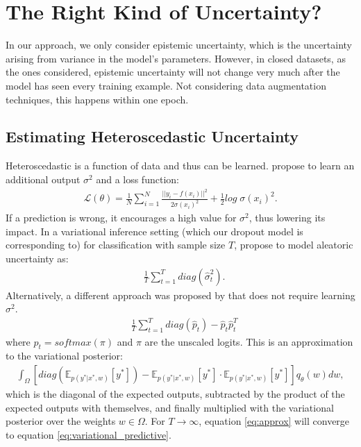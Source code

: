 \documentclass[a4paper,cleardoubleempty,BCOR1cm, 11pt]{report}
\begin{document}
\section{The Right Kind of Uncertainty?}
In our approach, we only consider epistemic uncertainty, which is the uncertainty arising from variance in the model's parameters. However, in closed datasets, as the ones considered, epistemic uncertainty will not change very much after the model has seen every training example. Not considering data augmentation techniques, this happens within one epoch. %


\subsection{Estimating Heteroscedastic Uncertainty}
Heteroscedastic is a function of data and thus can be learned. \citet{kendall2017uncertainties} propose to learn an additional output $\sigma^2$ and a loss function:
\begin{align}
\mathcal{L}(\theta) = \frac{1}{N}\sum_{i=1}^{N} \frac{||y_i-f(x_i)||^2}{2\sigma(x_i)^2} + \frac{1}{2}log\;\sigma(x_i)^2.
\end{align}
If a prediction is wrong, it encourages a high value for $\sigma^2$, thus lowering its impact. In a variational inference setting (which our dropout model is corresponding to) for classification with sample size $T$, \citet{kendall2017uncertainties} propose to model aleatoric uncertainty as:
\begin{align}
&\frac{1}{T}\sum_{t=1}^{T}diag(\hat{\sigma}_t^2).
\end{align}
Alternatively, a different approach was proposed by \citet{kwon2020uncertainty} that does not require learning $\sigma^2$. 
\begin{align}
\label{eq:approx}
&\frac{1}{T}\sum_{t=1}^{T}diag(\hat{p}_t) - \hat{p}_t\hat{p}_t^T
\end{align}
where $\hat{p}_t = softmax(\pi)$  and $\pi$ are the unscaled logits.
This is an approximation to the variational posterior:
\begin{align}
\label{eq:variational_predictive}
\int_{\Omega}\left[ diag (\mathbb{E}_{p(y^*|x^*,w)}[y^*]) -\mathbb{E}_{p(y^*|x^*,w)}[y^*] \cdot \mathbb{E}_{p(y^*|x^*,w)}[y^*] \right]q_{\theta}(w)dw,
\end{align}
which is the diagonal of the expected outputs, subtracted by the product of the expected outputs with themselves, and finally multiplied with the variational posterior over the weights $w\in \Omega$.  For $T\rightarrow \infty$, equation \ref{eq:approx} will converge to equation \ref{eq:variational_predictive}.
\end{document}
